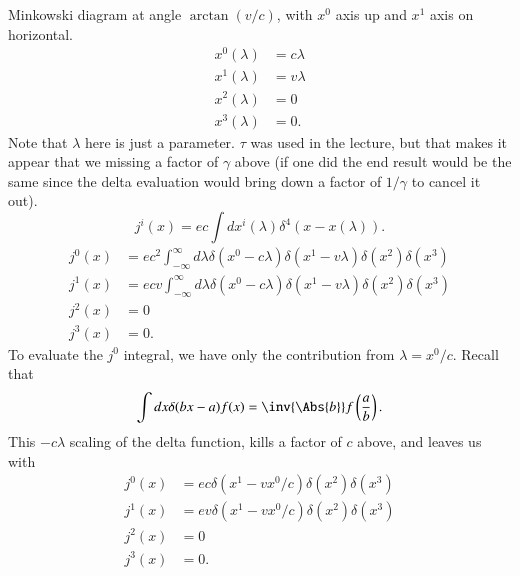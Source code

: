 Minkowski diagram at angle \(\arctan(v/c)\), with \(x^0\) axis up and \(x^1\) axis on horizontal.
%
\begin{equation}\label{eqn:relativisticElectrodynamicsL12b:450}
\begin{aligned}
x^0(\lambda) &= c \lambda \\
x^1(\lambda) &= v \lambda \\
x^2(\lambda) &= 0 \\
x^3(\lambda) &= 0.
\end{aligned}
\end{equation}
%
Note that \(\lambda\) here is just a parameter.  \(\tau\) was used in the lecture, but that makes it appear that we missing a factor of \(\gamma\) above (if one did the end result would be the same since the delta evaluation would bring down a factor of \(1/\gamma\) to cancel it out).
%
\begin{equation}\label{eqn:relativisticElectrodynamicsL12b:470}
j^i(x) = e c \int dx^i(\lambda) \delta^4 (x - x(\lambda)).
\end{equation}
%
\begin{equation}\label{eqn:relativisticElectrodynamicsL12b:490}
\begin{aligned}
j^0(x) &= e c^2  \int_{-\infty}^\infty d\lambda \delta(x^0 -  c \lambda) \delta(x^1 -  v \lambda) \delta(x^2) \delta(x^3) \\
j^1(x) &= e c v  \int_{-\infty}^\infty d\lambda \delta(x^0 -  c \lambda) \delta(x^1 -  v \lambda) \delta(x^2) \delta(x^3) \\
j^2(x) &= 0 \\
j^3(x) &= 0.
\end{aligned}
\end{equation}
%
To evaluate the \(j^0\) integral, we have only the contribution from \(\lambda = x^0/ c\).  Recall that
%
\begin{equation}\label{eqn:relativisticElectrodynamicsL12b:510}
\int dx \delta( b x - a) f(x) = \inv{\Abs{b}} f\left( \frac{a}{b} \right).
\end{equation}
%
This \(- c\lambda\) scaling of the delta function, kills a factor of \(c \) above, and leaves us with
%
\begin{equation}\label{eqn:relativisticElectrodynamicsL12b:530}
\begin{aligned}
j^0(x) &= e c \delta(x^1 - v x^0/c) \delta(x^2) \delta(x^3) \\
j^1(x) &= e v \delta(x^1 - v x^0/c) \delta(x^2) \delta(x^3) \\
j^2(x) &= 0 \\
j^3(x) &= 0.
\end{aligned}
\end{equation}

